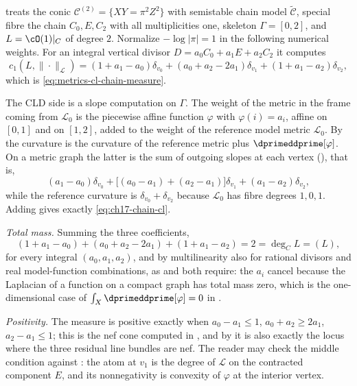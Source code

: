 \begin{example}
\label{ex:ch17-check-chain}
 treats the conic
$\mathcal C^{(2)}=\{XY=\pi^2Z^2\}$ with semistable chain model
$\widetilde{\mathcal C}$, special fibre the chain $C_0,E,C_2$ with all
multiplicities one, skeleton $\Gamma=[0,2]$, and $L=\cO(1)|_C$ of degree
$2$.  Normalize $-\log|\pi|=1$ in the following numerical weights.
For an integral vertical divisor $D=a_0C_0+a_1E+a_2C_2$ it computes
\begin{equation}
\label{eq:ch17-chain-cl}
 c_1(L,\|\cdot\|_{\mathcal L})
 =(1+a_1-a_0)\delta_{v_0}
 +(a_0+a_2-2a_1)\delta_{v_1}
 +(1+a_1-a_2)\delta_{v_2},
\end{equation}
which is \eqref{eq:metrics-cl-chain-measure}.

The CLD side is a slope computation on $\Gamma$.  The weight of the metric
in the frame coming from $\mathcal L_0$ is the piecewise affine function
$\varphi$ with $\varphi(i)=a_i$, affine on $[0,1]$ and on $[1,2]$,
added to the weight of the reference model metric $\mathcal L_0$.  By
 the curvature is the curvature of the
reference metric plus $\dprimeddprime[\varphi]$.  On a metric graph the
latter is the sum of outgoing slopes at each vertex
(), that is,
\[
 (a_1-a_0)\delta_{v_0}
 +\bigl[(a_0-a_1)+(a_2-a_1)\bigr]\delta_{v_1}
 +(a_1-a_2)\delta_{v_2},
\]
while the reference curvature is $\delta_{v_0}+\delta_{v_2}$ because
$\mathcal L_0$ has fibre degrees $1,0,1$.  Adding gives exactly
\eqref{eq:ch17-chain-cl}.

\emph{Total mass.}  Summing the three coefficients,
\[
 (1+a_1-a_0)+(a_0+a_2-2a_1)+(1+a_1-a_2)=2=\deg_CL=(L),
\]
for every integral $(a_0,a_1,a_2)$, and by multilinearity also for
rational divisors and real model-function combinations, as  and
 both require: the $a_i$ cancel because the
Laplacian of a function on a compact graph has total mass zero, which is the
one-dimensional case of
$\int_X\dprimeddprime[\varphi]=0$ in
.

\emph{Positivity.}  The measure is positive exactly when
$a_0-a_1\le1$, $a_0+a_2\ge2a_1$, $a_2-a_1\le1$; this is the nef cone
computed in , and by
 it is also exactly the locus where the
three residual line bundles are nef.  The reader may check the middle
condition against : the atom at $v_1$ is the
degree of $\mathcal L$ on the contracted component $E$, and its
nonnegativity is convexity of $\varphi$ at the interior vertex.
\end{example}

